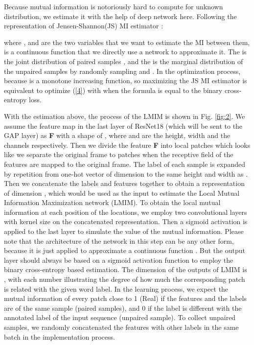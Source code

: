 \documentclass[a4paper, 10pt, conference]{ieeeconf}      \usepackage{FG2020}
\begin{document}
Because mutual information is notoriously hard to compute for unknown distribution, we estimate it with the help of deep network here. Following the representation of Jensen-Shannon(JS) MI estimator \cite{hjelm2018learning,nowozin2016f}:

\noindent where ,  and  are the two variables that we want to estimate the MI between them,   is a continuous function that we directly use a network to approximate it. The  is the joint distribution of paired samples , and the  is the marginal distribution of the unpaired samples  by randomly sampling  and . In the optimization process, because  is a monotone increasing function, so maximizing the JS MI estimator is equivalent to optimize (\ref{4}) with  when the formula is equal to the binary cross-entropy loss. 

With the estimation above, the process of the LMIM is shown in Fig. \ref{fig:2}. We assume the feature map in the last layer of ResNet18 (which will be sent to the GAP layer) as \textbf{F} with a shape of , where  and  are the height, width and the channels respectively. Then we divide the feature \textbf{F} into  local patches  which looks like we separate the original frame to  patches when the receptive field of the features are mapped to the original frame. The label of each sample is expanded by repetition from one-hot vector of dimension  to the same height and width as . Then we concatenate the labels and features together to obtain a representation of dimension , which would be used as the input to estimate the Local Mutual Information Maximization network (LMIM). To obtain the local mutual information at each position of the  locations, we employ two convolutional layers with kernel size  on the concatenated representation. Then a sigmoid activation is applied to the last layer to simulate the value of the mutual information. Please note that the architecture of the network in this step can be any other form, because it is just applied to approximate a continuous function . But the output layer should always be based on a sigmoid activation function to employ the binary cross-entropy based estimation. The dimension of the outputs of LMIM is , with each number illustrating the degree of how much the corresponding patch is related with the given word label. In the learning process, we expect the mutual information of every patch close to 1 (Real) if the features and the labels are of the same sample (paired samples), and 0 if the label is different with the annotated label of the input sequence (unpaired sample). To collect unpaired samples, we randomly concatenated the features with other labels in the same batch in the implementation process.
\end{document}
